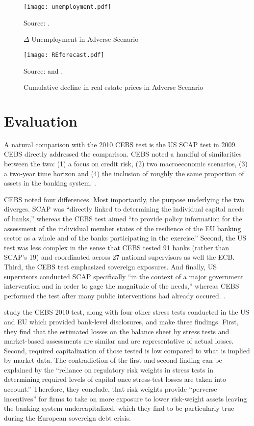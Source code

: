 \documentclass[12pt]{article}
\begin{document}
\begin{figure}[h]
\caption{$\Delta$ Unemployment in Adverse Scenario}\label{unemployment}
\centering
\texttt{[image: unemployment.pdf]}

\raggedright
\footnotesize Source: \citet{Methodology}.
\end{figure}

\begin{figure}[h]
\caption{Cumulative decline in real estate prices in Adverse Scenario}\label{REforecast}
\centering
\texttt{[image: REforecast.pdf]}
\raggedright
\footnotesize Source: \citet{Methodology} and \citet{SCAPResults}.
\end{figure}

\section{Evaluation}

A natural comparison with the 2010 CEBS test is the US SCAP test in 2009. CEBS directly addressed the comparison. CEBS noted a handful of similarities between the two: (1) a focus on credit risk, (2) two macroeconomic scenarios, (3) a two-year time horizon and (4) the inclusion of roughly the same proportion of assets in the banking system. \citep{QA}.

CEBS noted four differences. Most importantly, the purpose underlying the two diverges. SCAP was ``directly linked to determining the individual capital needs of banks,'' whereas the CEBS test aimed ``to provide policy information for the assessment of the individual member states of the resilience of the EU banking sector as a whole and of the banks participating in the exercise.'' Second, the US test was less complex in the sense that CEBS tested 91 banks (rather than SCAP's 19) and coordinated across 27 national supervisors as well the ECB. Third, the CEBS test emphasized sovereign exposures. And finally, US supervisors conducted SCAP specifically ``in the context of a major government intervention and in order to gage the magnitude of the needs,'' whereas CEBS performed the test after many public interventions had already occured. \citep{QA}.

\citet{Engle} study the CEBS 2010 test, along with four other stress tests conducted in the US and EU which provided bank-level disclosures, and make three findings. First, they find that the estimated losses on the balance sheet by stress tests and market-based assessments are similar and are representative of actual losses. Second, required capitalization of those tested is low compared to what is implied by market data. The contradiction of the first and second finding can be explained by the ``reliance on regulatory risk weights in stress tests in determining required levels of capital once stress-test losses are taken into account.'' Therefore, they conclude, that risk weights provide ``perverse incentives'' for firms to take on more exposure to lower risk-weight assets leaving the banking system undercapitalized, which they find to be particularly true during the European sovereign debt crisis.
\end{document}
